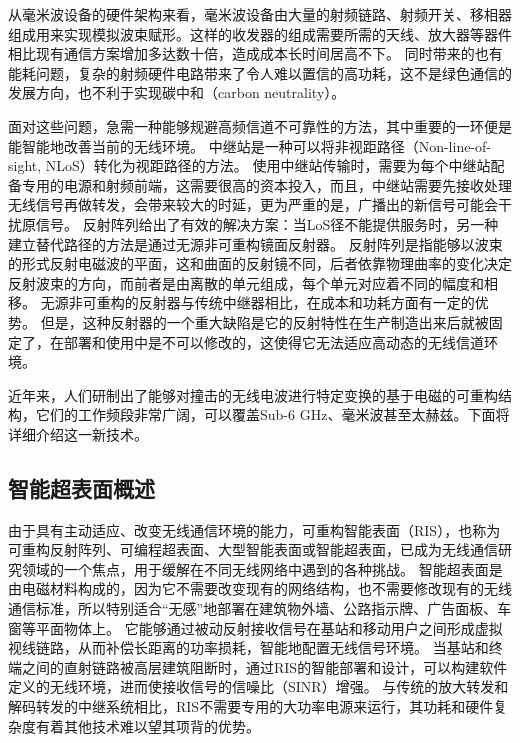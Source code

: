 \documentclass[supercite]{HustGraduPaper}
\begin{document}
从毫米波设备的硬件架构来看，毫米波设备由大量的射频链路、射频开关、移相器组成用来实现模拟波束赋形。这样的收发器的组成需要所需的天线、放大器等器件相比现有通信方案增加多达数十倍，造成成本长时间居高不下。
同时带来的也有能耗问题，复杂的射频硬件电路带来了令人难以置信的高功耗，这不是绿色通信的发展方向，也不利于实现碳中和（carbon neutrality）。

面对这些问题，急需一种能够规避高频信道不可靠性的方法，其中重要的一环便是能智能地改善当前的无线环境。
中继站是一种可以将非视距路径（Non-line-of-sight, NLoS）转化为视距路径的方法\cite{Dohler2010a}。
使用中继站传输时，需要为每个中继站配备专用的电源和射频前端，这需要很高的资本投入，而且，中继站需要先接收处理无线信号再做转发，会带来较大的时延，更为严重的是，广播出的新信号可能会干扰原信号\cite{di2020reconfigurable}。
反射阵列给出了有效的解决方案：当LoS径不能提供服务时，另一种建立替代路径的方法是通过无源非可重构镜面反射器。
反射阵列是指能够以波束的形式反射电磁波的平面\cite{huang2005reflectarray}，这和曲面的反射镜不同，后者依靠物理曲率的变化决定反射波束的方向，而前者是由离散的单元组成，每个单元对应着不同的幅度和相移\cite{pozar1997design}。
无源非可重构的反射器与传统中继器相比，在成本和功耗方面有一定的优势。
但是，这种反射器的一个重大缺陷是它的反射特性在生产制造出来后就被固定了，在部署和使用中是不可以修改的，这使得它无法适应高动态的无线信道环境。

近年来，人们研制出了能够对撞击的无线电波进行特定变换的基于电磁的可重构结构，它们的工作频段非常广阔，可以覆盖Sub-6 GHz、毫米波甚至太赫兹\cite{Wu2019}。下面将详细介绍这一新技术。

\subsection{智能超表面概述}

由于具有主动适应、改变无线通信环境的能力，可重构智能表面（RIS），也称为可重构反射阵列、可编程超表面、大型智能表面或智能超表面，已成为无线通信研究领域的一个焦点，用于缓解在不同无线网络中遇到的各种挑战\cite{liu2020ris, huang2020holographic}。
智能超表面是由电磁材料构成的，因为它不需要改变现有的网络结构，也不需要修改现有的无线通信标准，所以特别适合“无感”地部署在建筑物外墙、公路指示牌、广告面板、车窗等平面物体上。
它能够通过被动反射接收信号在基站和移动用户之间形成虚拟视线链路，从而补偿长距离的功率损耗，智能地配置无线信号环境。
当基站和终端之间的直射链路被高层建筑阻断时，通过RIS的智能部署和设计，可以构建软件定义的无线环境，进而使接收信号的信噪比（SINR）增强。
与传统的放大转发和解码转发的中继系统相比，RIS不需要专用的大功率电源来运行，其功耗和硬件复杂度有着其他技术难以望其项背的优势\cite{di2020reconfigurable}。
\end{document}
